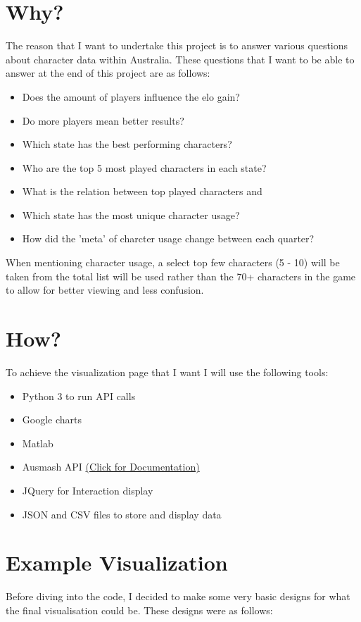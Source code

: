 \documentclass[11pt, oneside, a4paper]{article}
\begin{document}
\section*{Why?}
The reason that I want to undertake this project is to answer various questions about character data within Australia. These questions that I want to be able to answer at the end of this project are as follows:
\begin{itemize}
    \item Does the amount of players influence the elo gain?
    \item Do more players mean better results?
    \item Which state has the best performing characters?
    \item Who are the top 5 most played characters in each state?
    \item What is the relation between top played characters and 
    \item Which state has the most unique character usage?
    \item How did the 'meta' of charcter usage change between each quarter?
\end{itemize}
When mentioning character usage, a select top few characters (5 - 10) will be taken from the total list will be used rather than the 70+ characters in the game to allow for better viewing and less confusion.

\section*{How?}
To achieve the visualization page that I want I will use the following tools:
\begin{itemize}
    \item Python 3 to run API calls
    \item Google charts
    \item Matlab
    \item Ausmash API \href{https://api.ausmash.com.au/swagger/ui/index#/}{(Click for Documentation)}
    \item JQuery for Interaction display
    \item JSON and CSV files to store and display data
\end{itemize}

\section*{Example Visualization}
Before diving into the code, I decided to make some very basic designs for what the final visualisation could be. These designs were as follows:

{%
\setlength{\fboxsep}{0pt}%
\setlength{\fboxrule}{1pt}%
%
}%
\end{document}
